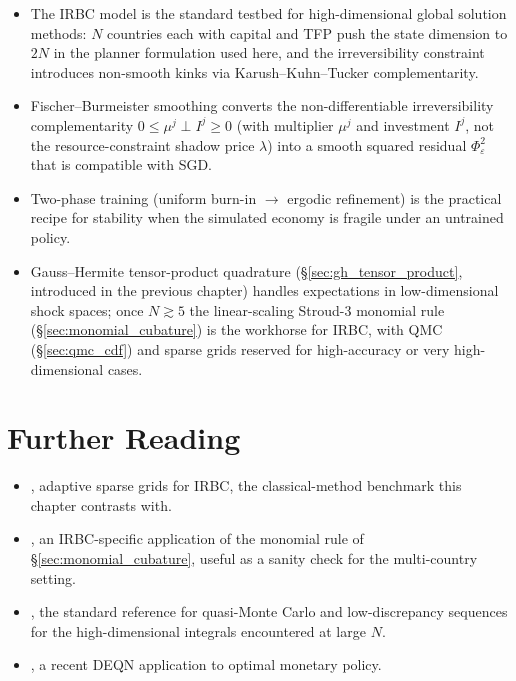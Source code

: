 \documentclass[11pt,a4paper]{report}
\begin{document}
\begin{keyinsightbox}
\begin{itemize}[itemsep=2pt, leftmargin=*]
\item The IRBC model is the standard testbed for high-dimensional global solution methods: $N$ countries each with capital and TFP push the state dimension to $2N$ in the planner formulation used here, and the irreversibility constraint introduces non-smooth kinks via Karush--Kuhn--Tucker complementarity.
\item Fischer--Burmeister smoothing converts the non-differentiable irreversibility complementarity $0 \le \mu^j \perp I^j \ge 0$ (with multiplier $\mu^j$ and investment $I^j$, not the resource-constraint shadow price $\lambda$) into a smooth squared residual $\Phi_\varepsilon^2$ that is compatible with SGD.
\item Two-phase training (uniform burn-in $\to$ ergodic refinement) is the practical recipe for stability when the simulated economy is fragile under an untrained policy.
\item Gauss--Hermite tensor-product quadrature (\S\ref{sec:gh_tensor_product}, introduced in the previous chapter) handles expectations in low-dimensional shock spaces; once $N \gtrsim 5$ the linear-scaling Stroud-3 monomial rule (\S\ref{sec:monomial_cubature}) is the workhorse for IRBC, with QMC (\S\ref{sec:qmc_cdf}) and sparse grids reserved for high-accuracy or very high-dimensional cases.
\end{itemize}
\end{keyinsightbox}

\section*{Further Reading}
\begin{itemize}[itemsep=2pt]
\item \citet{ECTA:ECTA1716}, adaptive sparse grids for IRBC, the classical-method benchmark this chapter contrasts with.
\item \citet{pichler2011}, an IRBC-specific application of the monomial rule of \S\ref{sec:monomial_cubature}, useful as a sanity check for the multi-country setting.
\item \citet{niederreiter1992random}, the standard reference for quasi-Monte Carlo and low-discrepancy sequences for the high-dimensional integrals encountered at large $N$.
\item \citet{nuno2024monetary}, a recent DEQN application to optimal monetary policy.
\end{itemize}
\end{document}
